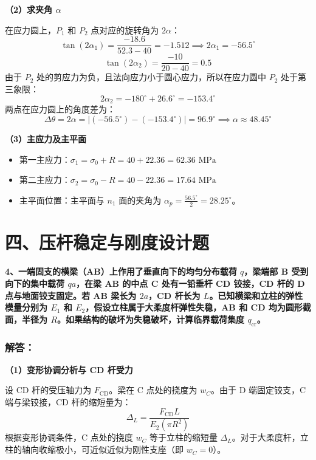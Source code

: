\documentclass[UTF8,fontset=windows]{ctexart}
\begin{document}
\textbf{（2）求夹角 $\alpha$}

在应力圆上，$P_1$ 和 $P_2$ 点对应的旋转角为 $2\alpha$：
\[
    \tan(2\alpha_1) = \frac{-18.6}{52.3 - 40} = -1.512 \implies 2\alpha_1 = -56.5^\circ
\]
\[
    \tan(2\alpha_2) = \frac{-10}{20 - 40} = 0.5
\]
由于 $P_2$ 处的剪应力为负，且法向应力小于圆心应力，所以在应力圆中 $P_2$ 处于第三象限：
\[
    2\alpha_2 = -180^\circ + 26.6^\circ = -153.4^\circ
\]
两点在应力圆上的角度差为：
\[
    \Delta \theta = 2\alpha = |(-56.5^\circ) - (-153.4^\circ)| = 96.9^\circ \implies \alpha \approx 48.45^\circ
\]

\textbf{（3）主应力及主平面}
\begin{itemize}
    \item 第一主应力：$\sigma_1 = \sigma_0 + R = 40 + 22.36 = 62.36\text{ MPa}$
    \item 第二主应力：$\sigma_2 = \sigma_0 - R = 40 - 22.36 = 17.64\text{ MPa}$
    \item 主平面位置：主平面与 $n_1$ 面的夹角为 $\alpha_p = \frac{56.5^\circ}{2} = 28.25^\circ$。
\end{itemize}

\newpage

\section*{四、压杆稳定与刚度设计题}

\textbf{4、一端固支的横梁（AB）上作用了垂直向下的均匀分布载荷 $q$，梁端部 B 受到向下的集中载荷 $qa$，在梁 AB 的中点 C 处有一铅垂杆 CD 铰接，CD 杆的 D 点与地面铰支固定。若 AB 梁长为 $2a$，CD 杆长为 $L$。已知横梁和立柱的弹性模量分别为 $E_1$ 和 $E_2$，假设立柱属于大柔度杆弹性失稳，AB 和 CD 均为圆形截面，半径为 $R$。如果结构的破坏为失稳破坏，计算临界载荷集度 $q_{\text{cr}}$。}

\subsubsection*{解答：}

\textbf{（1）变形协调分析与 CD 杆受力}

设 CD 杆的受压轴力为 $F_{\text{CD}}$。梁在 C 点处的挠度为 $w_C$。由于 D 端固定铰支，C 端与梁铰接，CD 杆的缩短量为：
\[
    \Delta_L = \frac{F_{\text{CD}} L}{E_2 (\pi R^2)}
\]
根据变形协调条件，C 点处的挠度 $w_C$ 等于立柱的缩短量 $\Delta_L$。对于大柔度杆，立柱的轴向收缩极小，可近似近似为刚性支座（即 $w_C = 0$）。
\end{document}
